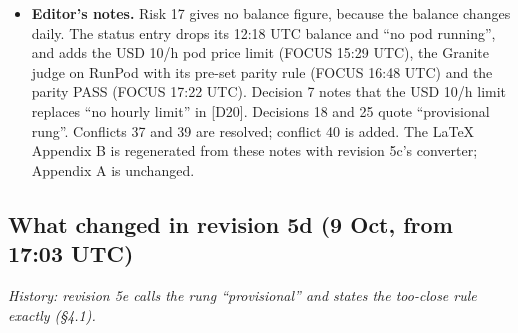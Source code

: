 \documentclass{article}
\theoremstyle{plain}
\theoremstyle{definition}
\theoremstyle{remark}
\begin{document}
\begin{itemize}
        the frozen one-seed Gate A bars''; ``the second family's first probe at
        recipe B'' became ``Llama's first probe at recipe B'' (\S{}3.5 and
        \S{}4.9 also say ``Llama''). \S{}4.1's ``Data'' keeps revision 5d's trim
        (``sealed per tokenizer''). No layout command was added. One cosmetic
        cost: in the LaTeX build, ``(20--55~pp)'' now breaks between ``20--55''
        and ``pp''. A tie there pushed the body again. Of the other trim sets
        tried in scratch builds, the only one that holds the length without the
        break changes ``respond to the same change of recipe by different
        amounts'' to ``respond differently to the same change of recipe'', which
        loses ``by different amounts''. So the break stays.
  \item \textbf{Editor's notes.} Risk 17 gives no balance figure, because the
        balance changes daily. The status entry drops its 12:18 UTC balance and
        ``no pod running'', and adds the USD 10/h pod price limit (FOCUS 15:29
        UTC), the Granite judge on RunPod with its pre-set parity rule (FOCUS
        16:48 UTC) and the parity PASS (FOCUS 17:22 UTC). Decision 7 notes that
        the USD 10/h limit replaces ``no hourly limit'' in [D20]. Decisions 18
        and 25 quote ``provisional rung''. Conflicts 37 and 39 are resolved;
        conflict 40 is added. The LaTeX Appendix B is regenerated from these
        notes with revision 5c's converter; Appendix A is unchanged.
\end{itemize}

\subsection{What changed in revision 5d (9 Oct, from 17:03 UTC)}

\emph{History: revision 5e calls the rung ``provisional'' and states the
too-close rule exactly (\S{}4.1).}
\end{document}
